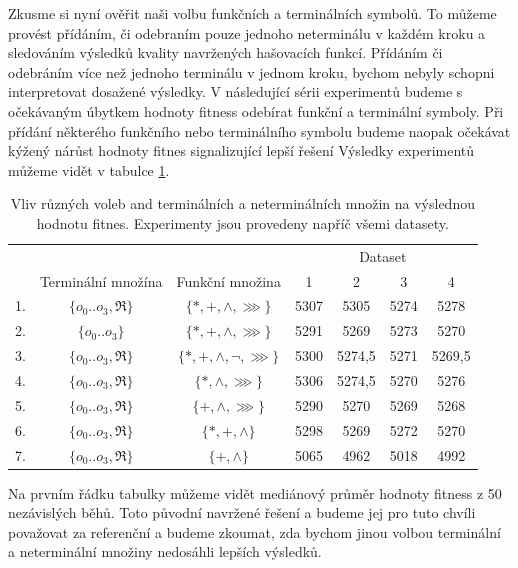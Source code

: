 Zkusme si nyní ověřit naši volbu funkčních a terminálních symbolů. To můžeme provést přídáním, či odebraním 
pouze jednoho neterminálu v každém kroku a sledováním výsledků kvality navržených hašovacích funkcí. Přídáním či
odebráním více než jednoho terminálu v jednom kroku, bychom nebyly schopni interpretovat dosažené výsledky. V 
následující sérii experimentů budeme s očekávaným úbytkem hodnoty fitness odebírat funkční a terminální symboly.
Při přídání některého funkčního nebo terminálního symbolu budeme naopak očekávat kýžený nárůst hodnoty fitnes 
signalizující lepší řešení Výsledky experimentů můžeme vidět v tabulce \ref{tab:basicRunAlternatives1}.

\begin{table}[h]
	\centering
	\caption{Vliv různých voleb and terminálních a neterminálních množin na výslednou hodnotu fitnes. Experimenty jsou provedeny
		napříč všemi datasety.}
	\begin{tabular}{lcccccc} \\ \hline
		   & & & \multicolumn{4}{c}{Dataset} \\
		   & Terminální množína & Funkční množina & 1 & 2 & 3 & 4 \\ \hline
		1. & $\{o_{0} .. o_{3}, \Re \}$ & $\{*, +, \wedge, \ggg\}$         & 5307 & 5305     & 5274 & 5278 \\
		2. & $\{o_{0} .. o_{3}\}$ & $\{*, +, \wedge, \ggg\}$                  & 5291 & 5269    & 5273 & 5270  \\
		3. & $\{o_{0} .. o_{3}, \Re \}$ & $\{*, +, \wedge, \neg, \ggg\}$ & 5300 & 5274,5 & 5271 &  5269,5 \\
		4. & $\{o_{0} .. o_{3}, \Re \}$ & $\{*, \wedge, \ggg\}$              & 5306 & 5274,5 & 5270 & 5276 \\
		5. & $\{o_{0} .. o_{3}, \Re \}$ & $\{+, \wedge, \ggg\}$ 			   & 5290 & 5270    & 5269  & 5268 \\
		6. & $\{o_{0} .. o_{3}, \Re \}$ & $\{*, +, \wedge\}$                   & 5298 & 5269    & 5272 & 5270 \\
		7. & $\{o_{0} .. o_{3}, \Re \}$ & $\{+, \wedge\}$                      & 5065 & 4962     & 5018 & 4992 \\
		\hline
	\end{tabular}
	\label{tab:basicRunAlternatives1}
\end{table}

Na prvním řádku tabulky můžeme vidět mediánový průměr hodnoty fitness z 50 nezávislých běhů. Toto původní
navržené řešení a budeme jej pro tuto chvíli považovat za referenční a budeme zkoumat, zda bychom jinou
volbou terminální a neterminální množiny nedosáhli lepších výsledků. 

